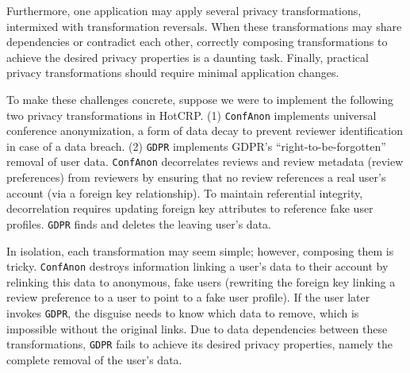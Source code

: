 Furthermore, one application may apply several privacy transformations, intermixed with
transformation reversals.  When these transformations may share dependencies or contradict each
other, correctly composing transformations to achieve the desired privacy properties is a daunting
task.
%
Finally, practical privacy transformations should require minimal application changes.
%

%
To make these challenges concrete, suppose we were to implement the following two privacy
transformations in HotCRP. 
%
(1) \texttt{ConfAnon} implements universal conference anonymization, a form of data decay to
prevent reviewer identification in case of a data breach.
%
(2) \texttt{GDPR} implements GDPR's ``right-to-be-forgotten'' removal of user data.
%
\texttt{ConfAnon} decorrelates reviews and review metadata (\eg review preferences) from reviewers
by ensuring that no review references a real user's account (via a foreign key relationship).
To maintain referential integrity, decorrelation requires updating foreign key
attributes to reference fake user profiles.
\texttt{GDPR} finds and deletes the leaving user's data.
%

%
In isolation, each transformation may seem simple; however, composing them is tricky.
\texttt{ConfAnon} destroys information linking a user's data to their account by relinking this data
to anonymous, fake users (\eg rewriting the foreign key linking a review preference to a user to
point to a fake user profile).  If the user later invokes \texttt{GDPR}, the
disguise needs to know which data to remove, which is impossible without the original links.
%
Due to data dependencies between these transformations, \texttt{GDPR} fails to achieve its desired
privacy properties, namely the complete removal of the user's data.
%
